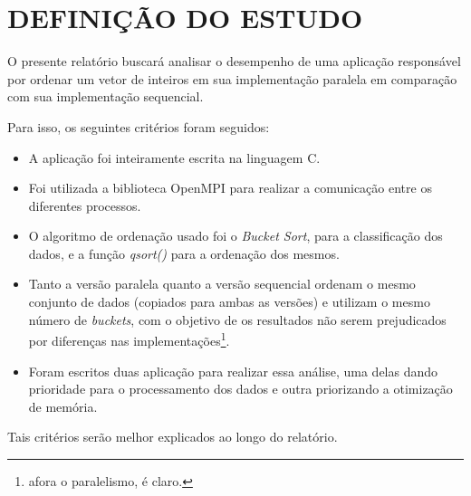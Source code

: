 \section{\normalsize DEFINIÇÃO DO ESTUDO} \label{definitions}
	O presente relatório buscará analisar o desempenho de uma aplicação responsável por ordenar um vetor de inteiros em sua implementação paralela em comparação com sua implementação sequencial.
	
	Para isso, os seguintes critérios foram seguidos:
	\begin{itemize}
		\item A aplicação foi inteiramente escrita na linguagem C.
		\item Foi utilizada a biblioteca OpenMPI para realizar a comunicação entre os diferentes processos.
		\item O algoritmo de ordenação usado foi o \textit{Bucket Sort}, para a classificação dos dados, e a função \textit{qsort()} para a ordenação dos mesmos.
		\item Tanto a versão paralela quanto a versão sequencial ordenam o mesmo conjunto de dados (copiados para ambas as versões) e utilizam o mesmo número de \textit{buckets}, com o objetivo de os resultados não serem prejudicados por diferenças nas implementações\footnote{afora o paralelismo, é claro.}. 
		\item Foram escritos duas aplicação para realizar essa análise, uma delas dando prioridade para o processamento dos dados e outra priorizando a otimização de memória.
	\end{itemize}
	
	Tais critérios serão melhor explicados ao longo do relatório.